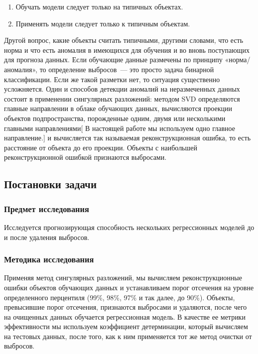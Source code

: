 \documentclass[a4paper,12pt]{article}
\begin{document}
\medskip
\noindent

\begin{enumerate}
	\item Обучать модели следует только на типичных объектах.
	\item Применять модели следует только к типичным объектам.
\end{enumerate}


\medskip
\noindent
Другой вопрос, какие объекты считать типичными, другими словами, что есть норма и что есть аномалия в имеющихся для обучения и во вновь поступающих для прогноза данных. Если обучающие данные размечены по принципу «норма/аномалия», то определение выбросов — это просто задача бинарной классификации. Если же такой разметки нет, то ситуация существенно усложняется.
Один и способов детекции аномалий на неразмеченных данных состоит в применении сингулярных разложений: методом SVD определяются главные направлении в облаке обучающих данных, вычисляются проекции объектов подпространства, порожденные одним, двумя или несколькими главными направлениями[ В настоящей работе мы используем одно главное направление.] и вычисляется так называемая реконструкционная ошибка, то есть расстояние от объекта до его проекции. Объекты с наибольшей реконструкционной ошибкой признаются выбросами.

\subsection{Постановки задачи}

\subsubsection{Предмет исследования}Исследуется прогнозирующая способность нескольких регрессионных моделей до и после удаления выбросов.

\subsubsection{Методика исследования} Применяя метод сингулярных разложений, мы вычисляем реконструкционные ошибки объектов обучающих данных и устанавливаем порог отсечения на уровне определенного перцентиля (99\%, 98\%, 97\% и так далее, до 90\%). Объекты, превысившие порог отсечения, признаются выбросами и удаляются, после чего на очищенных данных обучается регрессионная модель. В качестве ее метрики эффективности мы используем коэффициент детерминации, который вычисляем на тестовых данных, после того, как к ним применяется тот же метод очистки от выбросов. 
\end{document}
